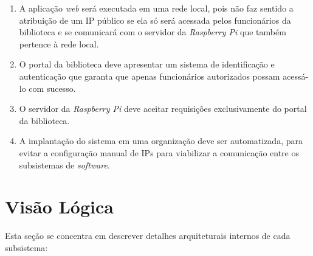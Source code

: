 \begin{enumerate}
    \item A aplicação \textit{web} será executada em uma rede local, pois não faz sentido a atribuição de um IP público se ela só será acessada pelos funcionários da biblioteca e se comunicará com o servidor da \textit{Raspberry Pi} que também pertence à rede local.

    \item O portal da biblioteca deve apresentar um sistema de identificação e autenticação que garanta que apenas funcionários autorizados possam acessá-lo com sucesso.

    \item O servidor da \textit{Raspberry Pi} deve aceitar requisições exclusivamente do portal da biblioteca.

    \item A implantação do sistema em uma organização deve ser automatizada, para evitar a configuração manual de IPs para viabilizar a comunicação entre os subsistemas de \textit{software}.
\end{enumerate}

\section{Visão Lógica}
Esta seção se concentra em descrever detalhes arquiteturais internos de cada subsistema:

